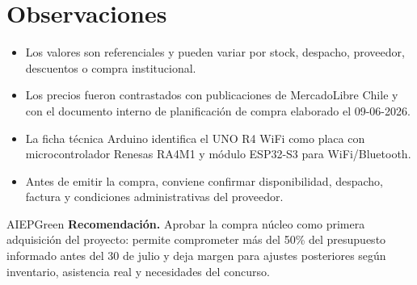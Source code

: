 \documentclass[10pt,letterpaper]{article}
\begin{document}
\section{Observaciones}

\begin{itemize}
  \item Los valores son referenciales y pueden variar por stock, despacho, proveedor, descuentos o compra institucional.
  \item Los precios fueron contrastados con publicaciones de MercadoLibre Chile y con el documento interno de planificación de compra elaborado el 09-06-2026.
  \item La ficha técnica Arduino identifica el UNO R4 WiFi como placa con microcontrolador Renesas RA4M1 y módulo ESP32-S3 para WiFi/Bluetooth.
  \item Antes de emitir la compra, conviene confirmar disponibilidad, despacho, factura y condiciones administrativas del proveedor.
\end{itemize}

\begin{infobox}{AIEPGreen}
\textbf{Recomendación.}
Aprobar la compra núcleo como primera adquisición del proyecto: permite comprometer más del 50\% del presupuesto informado antes del 30 de julio y deja margen para ajustes posteriores según inventario, asistencia real y necesidades del concurso.
\end{infobox}
\end{document}
